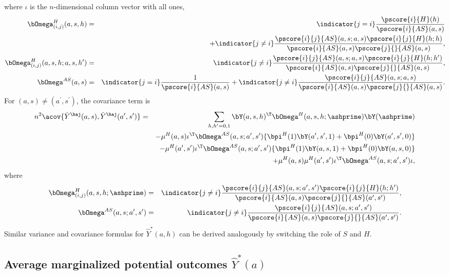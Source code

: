 where $\iota$ is the $n$-dimensional column vector with all ones, 
\begin{eqnarray*}
    \bOmega^{H}_{(i,j)}(a,s,h) &=& \indicator\{j=i\} \frac{\pscore{i}{H}(h)}{\pscore{i}{AS}(a,s)} \\
    &&+ \indicator\{j\neq i\} \frac{\pscore{i}{j}{AS}(a,s;a,s)\pscore{i}{j}{H}(h;h)}{\pscore{i}{AS}(a,s)\pscore{j}{}{AS}(a,s)}, \\
    \bOmega^{H}_{(i,j)}(a,s,h;a,s,h^{\prime}) &=& \indicator\{j\neq i\} \frac{\pscore{i}{j}{AS}(a,s;a,s)\pscore{i}{j}{H}(h;h^{\prime})}{\pscore{i}{AS}(a,s)\pscore{j}{}{AS}(a,s)}, \\
    \bOmega^{AS}(a,s) &=& \indicator\{j=i\}\frac{1}{\pscore{i}{AS}(a,s)} + \indicator\{j\neq i\} \frac{\pscore{i}{j}{AS}(a,s;a,s)}{\pscore{i}{AS}(a,s)\pscore{j}{}{AS}(a,s)}.
\end{eqnarray*}
For $(a,s)\neq(a^{\prime},s^{\prime})$, the covariance term is
\begin{eqnarray*}
    n^2\acov\{\hat Y^{\haj}(a,s), \hat Y^{\haj}(a^{\prime},s^{\prime})\} &=& \sum_{h,h^{\prime} = 0,1} \bY(a,s,h)^{\T} \bOmega^{H}(a,s,h;\ashprime)\bY(\ashprime) \\
    &&- \mu^{H}(a,s) \iota^{\T} \bOmega^{AS}(a,s;a^{\prime},s^{\prime}) \{\bpi^{H}(1) \bY(a^{\prime},s^{\prime},1) + \bpi^{H}(0) \bY(a^{\prime},s^{\prime},0)\} \\
    &&- \mu^{H}(a^{\prime},s^{\prime}) \iota^{\T} \bOmega^{AS}(a,s;a^{\prime},s^{\prime}) \{\bpi^{H}(1) \bY(a,s,1) + \bpi^{H}(0) \bY(a,s,0)\} \\
    &&+ \mu^{H}(a,s)\mu^{H}(a^{\prime},s^{\prime}) \iota^{\T} \bOmega^{AS}(a,s;a^{\prime},s^{\prime}) \iota,
\end{eqnarray*}
where
\begin{eqnarray*}
    \bOmega^{H}_{(i,j)}(a,s,h;\ashprime) &=& \indicator\{j\neq i\} \frac{\pscore{i}{j}{AS}(a,s;a^{\prime},s^{\prime})\pscore{i}{j}{H}(h;h^{\prime})}{\pscore{i}{AS}(a,s)\pscore{j}{}{AS}(a^{\prime},s^{\prime})}, \\
    \bOmega^{AS}(a,s;a^{\prime},s^{\prime}) &=& \indicator\{j\neq i\} \frac{\pscore{i}{j}{AS}(a,s;a^{\prime},s^{\prime})}{\pscore{i}{AS}(a,s)\pscore{j}{}{AS}(a^{\prime},s^{\prime})}.
\end{eqnarray*}
Similar variance and covariance formulas for $\hat Y^{*}(a,h)$ can be derived analogously by switching the role of $S$ and $H$.


\subsection{Average marginalized potential outcomes $\hat Y^{*}(a)$}